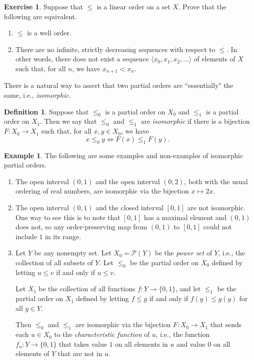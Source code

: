 \documentclass[a4paper]{memoir}
\theoremstyle{definition}
\newtheorem{definition}[theorem]{Definition}
\newtheorem{exercise}[theorem]{Exercise}
\newtheorem{example}[theorem]{Example}
\newcommand{\power}{\ensuremath{\mathscr{P}}}
\begin{document}
\begin{exercise}
  Suppose that $\leq$ is a linear order on a set $X$. Prove that the following are equivalent.
  \begin{enumerate}
    \item $\leq$ is a well order.
    \item There are no infinite, strictly decreasing sequences with respect to $\leq$. In other 
    words, there does not exist a sequence $\langle x_0, x_1, x_2, \ldots \rangle$ of elements 
    of $X$ such that, for all $n$, we have $x_{n+1} < x_n$.
  \end{enumerate}
\end{exercise}

There is a natural way to assert that two partial orders are ``essentially" the same, i.e., 
\emph{isomorphic}.

\begin{definition}
  Suppose that $\leq_0$ is a partial order on $X_0$ and $\leq_1$ is a partial order on 
  $X_1$. Then we say that $\leq_0$ and $\leq_1$ are \emph{isomorphic} if there is a bijection 
  $F:X_0 \rightarrow X_1$ such that, for all $x,y \in X_0$, we have 
  \[
    x \leq_0 y \Longleftrightarrow F(x) \leq_1 F(y).
  \]
\end{definition}

\begin{example}
  The following are some examples and non-examples of isomorphic partial orders.
  \begin{enumerate}
    \item The open interval $(0,1)$ and the open interval $(0,2)$, both with the usual ordering 
    of real numbers, are isomorphic via the bijection $x \mapsto 2x$.
    \item The open interval $(0,1)$ and the closed interval $[0,1]$ are not isomorphic. One way to 
    see this is to note that $[0,1]$ has a maximal element and $(0,1)$ does not, so any 
    order-preserving map from $(0,1)$ to $[0,1]$ could not include $1$ in its range.
    \item Let $Y$ be any nonempty set. Let $X_0 = \power(Y)$ be the \emph{power set} of $Y$, i.e., 
    the collection of all subsets of $Y$. Let $\leq_0$ be the partial order on $X_0$ defined by 
    letting $u \leq v$ if and only if $u \leq v$.
    
    Let $X_1$ be the collection of all functions $f : Y \rightarrow \{0,1\}$, and let $\leq_1$ 
    be the partial order on $X_1$ defined by letting $f \leq g$ if and only if 
    $f(y) \leq g(y)$ for all $y \in Y$.
    
    Then $\leq_0$ and $\leq_1$ are isomorphic via the bijection $F : X_0 \rightarrow X_1$ that 
    sends each $u \in X_0$ to the \emph{characteristic function} of $u$, i.e., the function 
    $f_u : Y \rightarrow \{0,1\}$ that takes value $1$ on all elements in $u$ and value $0$ on all 
    elements of $Y$ that are not in $u$.
  \end{enumerate}
\end{example}
\end{document}
